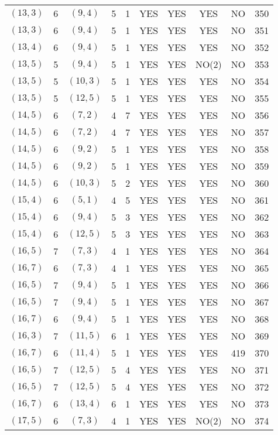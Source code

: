 \begin{longtable}{|c|c|c|c|c|c|c|c|c|c|}
$(13, 3)$ & 6 & $(9, 4)$ & 5 & 1 & YES & YES & YES & NO & 350\\
$(13, 3)$ & 6 & $(9, 4)$ & 5 & 1 & YES & YES & YES & NO & 351\\
$(13, 4)$ & 6 & $(9, 4)$ & 5 & 1 & YES & YES & YES & NO & 352\\
$(13, 5)$ & 5 & $(9, 4)$ & 5 & 1 & YES & YES & NO(2) & NO & 353\\
$(13, 5)$ & 5 & $(10, 3)$ & 5 & 1 & YES & YES & YES & NO & 354\\
$(13, 5)$ & 5 & $(12, 5)$ & 5 & 1 & YES & YES & YES & NO & 355\\
$(14, 5)$ & 6 & $(7, 2)$ & 4 & 7 & YES & YES & YES & NO & 356\\
$(14, 5)$ & 6 & $(7, 2)$ & 4 & 7 & YES & YES & YES & NO & 357\\
$(14, 5)$ & 6 & $(9, 2)$ & 5 & 1 & YES & YES & YES & NO & 358\\
$(14, 5)$ & 6 & $(9, 2)$ & 5 & 1 & YES & YES & YES & NO & 359\\
$(14, 5)$ & 6 & $(10, 3)$ & 5 & 2 & YES & YES & YES & NO & 360\\
$(15, 4)$ & 6 & $(5, 1)$ & 4 & 5 & YES & YES & YES & NO & 361\\
$(15, 4)$ & 6 & $(9, 4)$ & 5 & 3 & YES & YES & YES & NO & 362\\
$(15, 4)$ & 6 & $(12, 5)$ & 5 & 3 & YES & YES & YES & NO & 363\\
$(16, 5)$ & 7 & $(7, 3)$ & 4 & 1 & YES & YES & YES & NO & 364\\
$(16, 7)$ & 6 & $(7, 3)$ & 4 & 1 & YES & YES & YES & NO & 365\\
$(16, 5)$ & 7 & $(9, 4)$ & 5 & 1 & YES & YES & YES & NO & 366\\
$(16, 5)$ & 7 & $(9, 4)$ & 5 & 1 & YES & YES & YES & NO & 367\\
$(16, 7)$ & 6 & $(9, 4)$ & 5 & 1 & YES & YES & YES & NO & 368\\
$(16, 3)$ & 7 & $(11, 5)$ & 6 & 1 & YES & YES & YES & NO & 369\\
$(16, 7)$ & 6 & $(11, 4)$ & 5 & 1 & YES & YES & YES & 419 & 370\\
$(16, 5)$ & 7 & $(12, 5)$ & 5 & 4 & YES & YES & YES & NO & 371\\
$(16, 5)$ & 7 & $(12, 5)$ & 5 & 4 & YES & YES & YES & NO & 372\\
$(16, 7)$ & 6 & $(13, 4)$ & 6 & 1 & YES & YES & YES & NO & 373\\
$(17, 5)$ & 6 & $(7, 3)$ & 4 & 1 & YES & YES & NO(2) & NO & 374\\

\end{longtable}
